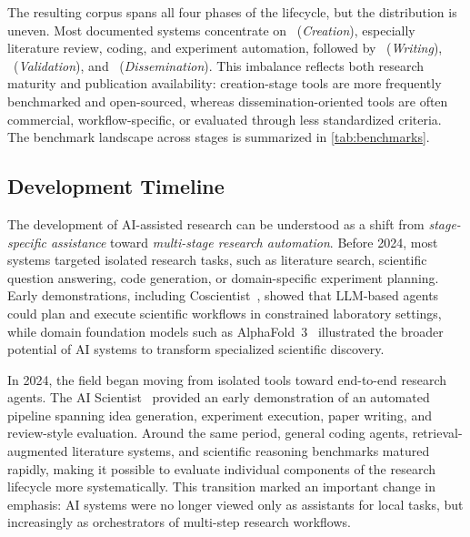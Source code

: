The resulting corpus spans all four phases of the lifecycle, but the distribution is uneven. Most documented systems concentrate on ~(\emph{Creation}), especially literature review, coding, and experiment automation, followed by ~(\emph{Writing}), ~(\emph{Validation}), and ~(\emph{Dissemination}). This imbalance reflects both research maturity and publication availability: creation-stage tools are more frequently benchmarked and open-sourced, whereas dissemination-oriented tools are often commercial, workflow-specific, or evaluated through less standardized criteria. The benchmark landscape across stages is summarized in \cref{tab:benchmarks}.





\subsection{Development Timeline}
\label{sec:timeline}


The development of AI-assisted research can be understood as a shift from \emph{stage-specific assistance} toward \emph{multi-stage research automation}. Before 2024, most systems targeted isolated research tasks, such as literature search, scientific question answering, code generation, or domain-specific experiment planning. Early demonstrations, including Coscientist~\cite{boiko2023coscientist}, showed that LLM-based agents could plan and execute scientific workflows in constrained laboratory settings, while domain foundation models such as AlphaFold~3~\cite{abramson2024alphafold3} illustrated the broader potential of AI systems to transform specialized scientific discovery.

In 2024, the field began moving from isolated tools toward end-to-end research agents. The AI Scientist~\cite{lu2024aiscientist} provided an early demonstration of an automated pipeline spanning idea generation, experiment execution, paper writing, and review-style evaluation. Around the same period, general coding agents, retrieval-augmented literature systems, and scientific reasoning benchmarks matured rapidly, making it possible to evaluate individual components of the research lifecycle more systematically. This transition marked an important change in emphasis: AI systems were no longer viewed only as assistants for local tasks, but increasingly as orchestrators of multi-step research workflows.

